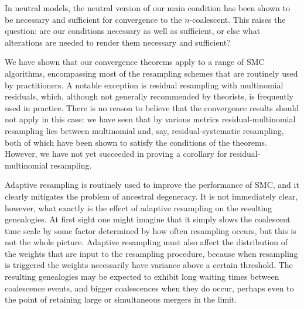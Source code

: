 In neutral models, the neutral version of our main condition has been shown to be necessary and sufficient for convergence to the $n$-coalescent. This raises the question: are our conditions necessary as well as sufficient, or else what alterations are needed to render them necessary and sufficient?

We have shown that our convergence theorems apply to a range of SMC algorithms, encompassing most of the resampling schemes that are routinely used by practitioners. A notable exception is residual resampling with multinomial residuals, which, although not generally recommended by theorists, is frequently used in practice.
There is no reason to believe that the convergence results should not apply in this case: we have seen that by various metrics residual-multinomial resampling lies between multinomial and, say, residual-systematic resampling, both of which have been shown to satisfy the conditions of the theorems.
However, we have not yet succeeded in proving a corollary for residual-multinomial resampling.

Adaptive resampling is routinely used to improve the performance of SMC, and it clearly mitigates the problem of ancestral degeneracy. It is not immediately clear, however, what exactly is the effect of adaptive resampling on the resulting genealogies. At first sight one might imagine that it simply slows the coalescent time scale by some factor determined by how often resampling occurs, but this is not the whole picture. Adaptive resampling must also affect the distribution of the weights that are input to the resampling procedure, because when resampling is triggered the weights necessarily have variance above a certain threshold.
The resulting genealogies may be expected to exhibit long waiting times between coalescence events, and bigger coalescences when they do occur, perhaps even to the point of retaining large or simultaneous mergers in the limit.
